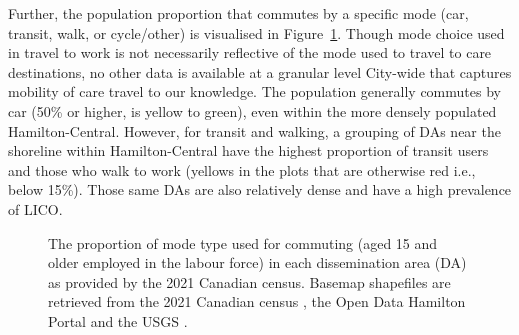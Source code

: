 \documentclass[
  authoryear,
  preprint,
  3p]{elsarticle}
\begin{document}
Further, the population proportion that commutes by a specific mode
(car, transit, walk, or cycle/other) is visualised in
Figure~\ref{fig-Fig4}. Though mode choice used in travel to work is not
necessarily reflective of the mode used to travel to care destinations,
no other data is available at a granular level City-wide that captures
mobility of care travel to our knowledge. The population generally
commutes by car (50\% or higher, is yellow to green), even within the
more densely populated Hamilton-Central. However, for transit and
walking, a grouping of DAs near the shoreline within Hamilton-Central
have the highest proportion of transit users and those who walk to work
(yellows in the plots that are otherwise red i.e., below 15\%). Those
same DAs are also relatively dense and have a high prevalence of LICO.

\begin{figure}


\caption{\label{fig-Fig4}The proportion of mode type used for commuting
(aged 15 and older employed in the labour force) in each dissemination
area (DA) as provided by the 2021 Canadian census. Basemap shapefiles
are retrieved from the 2021 Canadian census
\citep{governmentofcanadaCensusPopulation2023}, the Open Data Hamilton
Portal \citep{opendatahamiltonCityBoundary2023} and the USGS
\citep{greatlakesUSGS2010}.}

\end{figure}%
\end{document}
